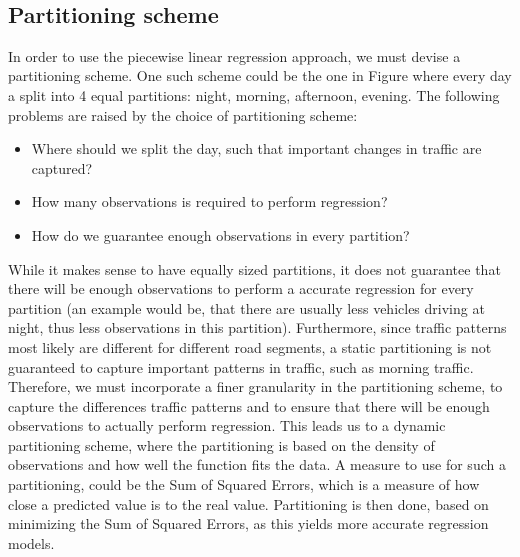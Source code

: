 %
\\
\subsection{Partitioning scheme}\label{patterns:segmentation}

In order to use the piecewise linear regression approach, we must devise a partitioning scheme. One such scheme could be the one in Figure \label{fig:segmented-regression} where every day a split into 4 equal partitions: night, morning, afternoon, evening. The following problems are raised by the choice of partitioning scheme:
\begin{itemize}
	\item Where should we split the day, such that important changes in traffic are captured?
	\item How many observations is required to perform regression?
	\item How do we guarantee enough observations in every partition?
\end{itemize}
While it makes sense to have equally sized partitions, it does not guarantee that there will be enough observations to perform a accurate regression for every partition (an example would be, that there are usually less vehicles driving at night, thus less observations in this partition). Furthermore, since traffic patterns most likely are different for different road segments, a static partitioning is not guaranteed to capture important patterns in traffic, such as morning traffic. Therefore, we must incorporate a finer granularity in the partitioning scheme, to capture the differences traffic patterns and to ensure that there will be enough observations to actually perform regression.
This leads us to a dynamic partitioning scheme, where the partitioning is based on the density of observations and how well the function fits the data. A measure to use for such a partitioning, could be the Sum of Squared Errors, which is a measure of how close a predicted value is to the real value. Partitioning is then done, based on minimizing the Sum of Squared Errors, as this yields more accurate regression models.

